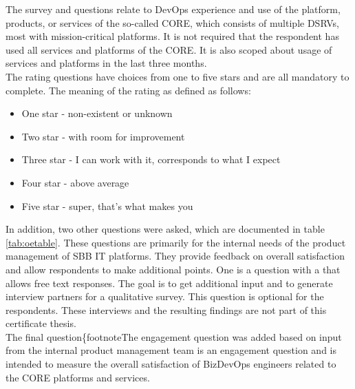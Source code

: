 \documentclass[a4paper,12pt]{article}
\begin{document}
    The survey and questions relate to DevOps experience and use of the platform, products, or services of the so-called CORE,
    which consists of multiple DSRVs, most with mission-critical platforms.
    It is not required that the respondent has used all services and platforms of the CORE.
    It is also scoped about usage of services and platforms in the last three months.\\
    The rating questions have choices from one to five stars and are all mandatory to complete.
    The meaning of the rating as defined as follows:
    \begin{itemize}
        \item One star - non-existent or unknown
        \item Two star - with room for improvement
        \item Three star - I can work with it, corresponds to what I expect
        \item Four star - above average
        \item Five star - super, that's what makes you
    \end{itemize}

    In addition, two other questions were asked, which are documented in table \ref{tab:oetable}.
    These questions are primarily for the internal needs of the product management of SBB IT platforms.
    They provide feedback on overall satisfaction and allow respondents to make additional points.
    One is a question with a that allows free text responses.
    The goal is to get additional input and to generate interview partners for a qualitative survey.
    This question is optional for the respondents.
    These interviews and the resulting findings are not part of this certificate thesis.\\
    The final question\{footnote{The engagement question was added based on input from the internal product management team}
    is an engagement question and is intended to measure the overall satisfaction of BizDevOps engineers related to the CORE platforms and services.
\end{document}
